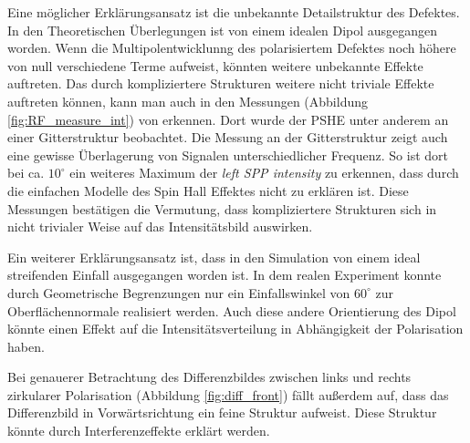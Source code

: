 \documentclass[titlepage]{article}
\begin{document}
	Eine möglicher Erklärungsansatz ist die unbekannte Detailstruktur des Defektes. In den Theoretischen Überlegungen ist von einem idealen Dipol ausgegangen worden. Wenn die Multipolentwicklunng des polarisiertem Defektes noch höhere von null verschiedene Terme aufweist, könnten weitere unbekannte Effekte auftreten. Das durch kompliziertere Strukturen weitere nicht triviale Effekte auftreten können, kann man auch in den Messungen (Abbildung \ref{fig:RF_measure_int}) von \cite{RodriguezFortuno.2013} erkennen. Dort wurde der PSHE unter anderem an einer Gitterstruktur beobachtet. Die Messung an der Gitterstruktur zeigt auch eine gewisse Überlagerung von Signalen unterschiedlicher Frequenz. So ist dort bei ca. $10^\circ$ ein weiteres Maximum der \textit{left SPP intensity} zu erkennen, dass durch die einfachen Modelle des Spin Hall Effektes nicht zu erklären ist. Diese Messungen bestätigen die Vermutung, dass kompliziertere Strukturen sich in nicht trivialer Weise auf das Intensitätsbild auswirken.
	
	Ein weiterer Erklärungsansatz ist, dass in den Simulation von einem ideal streifenden Einfall ausgegangen worden ist. In dem realen Experiment konnte durch Geometrische Begrenzungen nur ein Einfallswinkel von $60^\circ$ zur Oberflächennormale realisiert werden. Auch diese andere Orientierung des Dipol könnte einen Effekt auf die Intensitätsverteilung in Abhängigkeit der Polarisation haben.
	
	Bei genauerer Betrachtung des Differenzbildes zwischen links und rechts zirkularer Polarisation (Abbildung \ref{fig:diff_front}) fällt außerdem auf, dass das Differenzbild in Vorwärtsrichtung ein feine Struktur aufweist. Diese Struktur könnte durch Interferenzeffekte erklärt werden.
\end{document}
